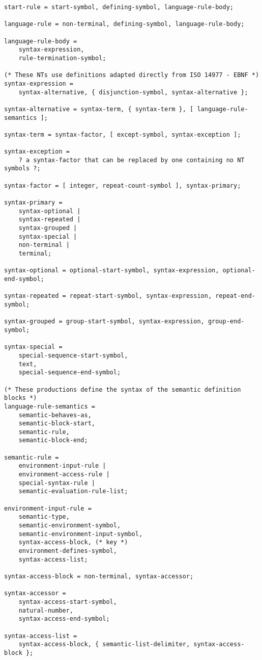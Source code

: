 \begin{verbatim}
start-rule = start-symbol, defining-symbol, language-rule-body;

language-rule = non-terminal, defining-symbol, language-rule-body;

language-rule-body = 
    syntax-expression,
    rule-termination-symbol;

(* These NTs use definitions adapted directly from ISO 14977 - EBNF *)
syntax-expression = 
    syntax-alternative, { disjunction-symbol, syntax-alternative };

syntax-alternative = syntax-term, { syntax-term }, [ language-rule-semantics ];

syntax-term = syntax-factor, [ except-symbol, syntax-exception ];

syntax-exception = 
    ? a syntax-factor that can be replaced by one containing no NT symbols ?;

syntax-factor = [ integer, repeat-count-symbol ], syntax-primary;

syntax-primary = 
    syntax-optional | 
    syntax-repeated |
    syntax-grouped |
    syntax-special |
    non-terminal |
    terminal;

syntax-optional = optional-start-symbol, syntax-expression, optional-end-symbol;

syntax-repeated = repeat-start-symbol, syntax-expression, repeat-end-symbol;

syntax-grouped = group-start-symbol, syntax-expression, group-end-symbol;

syntax-special =
    special-sequence-start-symbol,
    text,
    special-sequence-end-symbol;

(* These productions define the syntax of the semantic definition blocks *)
language-rule-semantics = 
    semantic-behaves-as,
    semantic-block-start,
    semantic-rule,
    semantic-block-end;

semantic-rule = 
    environment-input-rule |
    environment-access-rule |
    special-syntax-rule |
    semantic-evaluation-rule-list;

environment-input-rule =
    semantic-type, 
    semantic-environment-symbol,
    semantic-environment-input-symbol,
    syntax-access-block, (* key *)
    environment-defines-symbol,
    syntax-access-list;

syntax-access-block = non-terminal, syntax-accessor;

syntax-accessor = 
    syntax-access-start-symbol,
    natural-number,
    syntax-access-end-symbol;

syntax-access-list = 
    syntax-access-block, { semantic-list-delimiter, syntax-access-block };


\end{verbatim}
